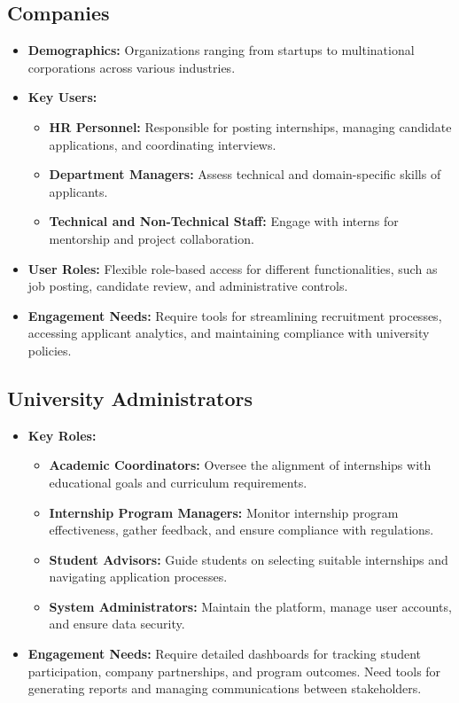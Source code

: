 \subsection{Companies}
\begin{itemize}
    \item \textbf{Demographics:} Organizations ranging from startups to multinational corporations across various industries.
    \item \textbf{Key Users:}
        \begin{itemize}
            \item \textbf{HR Personnel:} Responsible for posting internships, managing candidate applications, and coordinating interviews.
            \item \textbf{Department Managers:} Assess technical and domain-specific skills of applicants.
            \item \textbf{Technical and Non-Technical Staff:} Engage with interns for mentorship and project collaboration.
        \end{itemize}
    \item \textbf{User Roles:} Flexible role-based access for different functionalities, such as job posting, candidate review, and administrative controls.
    \item \textbf{Engagement Needs:} Require tools for streamlining recruitment processes, accessing applicant analytics, and maintaining compliance with university policies.
\end{itemize}

\subsection{University Administrators}
\begin{itemize}
    \item \textbf{Key Roles:}
        \begin{itemize}
            \item \textbf{Academic Coordinators:} Oversee the alignment of internships with educational goals and curriculum requirements.
            \item \textbf{Internship Program Managers:} Monitor internship program effectiveness, gather feedback, and ensure compliance with regulations.
            \item \textbf{Student Advisors:} Guide students on selecting suitable internships and navigating application processes.
            \item \textbf{System Administrators:} Maintain the platform, manage user accounts, and ensure data security.
        \end{itemize}
    \item \textbf{Engagement Needs:} Require detailed dashboards for tracking student participation, company partnerships, and program outcomes. Need tools for generating reports and managing communications between stakeholders.
\end{itemize}


